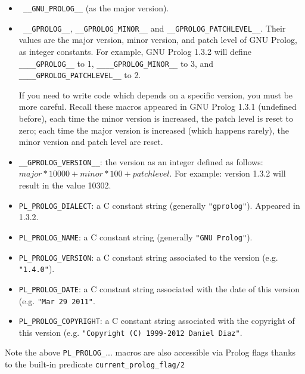 \begin{itemize}

\item \texttt{ \_\_GNU\_PROLOG\_\_} (as the major version).

\item \texttt{ \_\_GPROLOG\_\_}, \texttt{\_\_GPROLOG\_MINOR\_\_} and
  \texttt{\_\_GPROLOG\_PATCHLEVEL\_\_}. Their values are the major version,
  minor version, and patch level of GNU Prolog, as integer constants. For
  example, GNU Prolog 1.3.2 will define \texttt{\_\_\_\_GPROLOG\_\_} to 1,
  \texttt{\_\_\_\_GPROLOG\_MINOR\_\_} to 3, and
  \texttt{\_\_\_\_GPROLOG\_PATCHLEVEL\_\_} to 2.

  If you need to write code which depends on a specific version, you must be
  more careful. Recall these macros appeared in GNU Prolog 1.3.1 (undefined
  before), each time the minor version is increased, the patch level is reset
  to zero; each time the major version is increased (which happens rarely),
  the minor version and patch level are reset.

\item \texttt{\_\_GPROLOG\_VERSION\_\_}: the version as an integer defined as
  follows: $major * 10000 + minor * 100 + patch level$. For example: version
  1.3.2 will result in the value 10302.

\item \texttt{PL\_PROLOG\_DIALECT}: a C constant string (generally
  \texttt{"gprolog"}). Appeared in 1.3.2.

\item \texttt{PL\_PROLOG\_NAME}: a C constant string (generally
  \texttt{"GNU Prolog"}).

\item \texttt{PL\_PROLOG\_VERSION}: a C constant string associated to the
  version (e.g. \texttt{"1.4.0"}).

\item \texttt{PL\_PROLOG\_DATE}: a C constant string associated with the date
  of this version (e.g. \texttt{"Mar 29 2011"}.

\item \texttt{PL\_PROLOG\_COPYRIGHT}: a C constant string associated with the
  copyright of this version (e.g. \texttt{"Copyright (C) 1999-2012 Daniel Diaz"}.

\end{itemize}

Note the above \texttt{PL\_PROLOG\_}... macros are also accessible via Prolog
flags thanks to the built-in predicate \texttt{current\_prolog\_flag/2}



